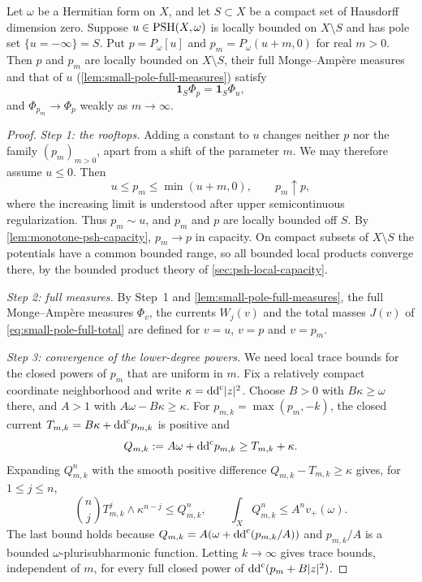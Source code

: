 \begin{theorem}\label{thm:small-pole-envelope-residual}
Let $\omega$ be a Hermitian form on $X$, and let $S\subset X$ be a compact set of Hausdorff dimension zero. Suppose $u\in\mathrm{PSH}(X,\omega)$ is locally bounded on $X\setminus S$ and has pole set $\{u=-\infty\}=S$. Put $p=P_\omega[u]$ and $p_m=P_\omega(u+m,0)$ for real $m>0$. Then $p$ and $p_m$ are locally bounded on $X\setminus S$, their full Monge--Amp\`ere measures and that of $u$ (\cref{lem:small-pole-full-measures}) satisfy
\[
 \mathbf1_S\Phi_p=\mathbf1_S\Phi_u,
\]
and $\Phi_{p_m}\to\Phi_p$ weakly as $m\to\infty$.
\end{theorem}
\begin{proof}
\emph{Step 1: the rooftops.} Adding a constant to $u$ changes neither $p$ nor the family $(p_m)_{m>0}$, apart from a shift of the parameter $m$. We may therefore assume $u\leq0$. Then
\[
 u\leq p_m\leq\min(u+m,0),\qquad p_m\uparrow p,
\]
where the increasing limit is understood after upper semicontinuous regularization. Thus $p_m\sim u$, and $p_m$ and $p$ are locally bounded off $S$. By \cref{lem:monotone-psh-capacity}, $p_m\to p$ in capacity. On compact subsets of $X\setminus S$ the potentials have a common bounded range, so all bounded local products converge there, by the bounded product theory of \cref{sec:psh-local-capacity}.

\emph{Step 2: full measures.} By Step~1 and \cref{lem:small-pole-full-measures}, the full Monge--Amp\`ere measures $\Phi_v$, the currents $W_j(v)$ and the total masses $J(v)$ of \eqref{eq:small-pole-full-total} are defined for $v=u$, $v=p$ and $v=p_m$.

\emph{Step 3: convergence of the lower-degree powers.} We need local trace bounds for the closed powers of $p_m$ that are uniform in $m$. Fix a relatively compact coordinate neighborhood and write $\kappa=\mathrm{dd}^{\mathrm{c}}|z|^2$. Choose $B>0$ with $B\kappa\geq\omega$ there, and $A>1$ with $A\omega-B\kappa\geq\kappa$. For $p_{m,k}=\max(p_m,-k)$, the closed current
$T_{m,k}=B\kappa+\mathrm{dd}^{\mathrm{c}} p_{m,k}$ is positive and
\[
 Q_{m,k}:=A\omega+\mathrm{dd}^{\mathrm{c}} p_{m,k}\geq T_{m,k}+\kappa.
\]
Expanding $Q_{m,k}^n$ with the smooth positive difference $Q_{m,k}-T_{m,k}\geq\kappa$ gives, for $1\leq j\leq n$,
\[
 \binom nj T_{m,k}^j\wedge\kappa^{n-j}
       \leq Q_{m,k}^n,
 \qquad
 \int_XQ_{m,k}^n\leq A^n v_+(\omega).
\]
The last bound holds because $Q_{m,k}=A(\omega+\mathrm{dd}^{\mathrm{c}}(p_{m,k}/A))$ and $p_{m,k}/A$ is a bounded $\omega$-plurisubharmonic function. Letting $k\to\infty$ gives trace bounds, independent of $m$, for every full closed power of $\mathrm{dd}^{\mathrm{c}}(p_m+B|z|^2)$.


\end{proof}
